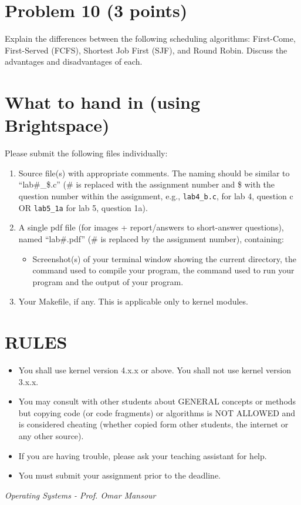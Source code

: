 \documentclass{article}
\begin{document}
\section*{Problem 10 (3 points)}

Explain the differences between the following scheduling algorithms: First-Come, First-Served (FCFS), Shortest Job First (SJF), and Round Robin.  Discuss the advantages and disadvantages of each.


\section*{What to hand in (using Brightspace)}

Please submit the following files individually:

\begin{enumerate}
    \item Source file(s) with appropriate comments. The naming should be similar to “lab\#\_\$.c” (\# is replaced with the assignment number and \$ with the question number within the assignment, e.g., \texttt{lab4\_b.c}, for lab 4, question c OR \texttt{lab5\_1a} for lab 5, question 1a).
    \item A single pdf file (for images + report/answers to short-answer questions), named “lab\#.pdf” (\# is replaced by the assignment number), containing:
    \begin{itemize}
        \item Screenshot(s) of your terminal window showing the current directory, the command used to compile your program, the command used to run your program and the output of your program.
    \end{itemize}
    \item Your Makefile, if any. This is applicable only to kernel modules.
\end{enumerate}


\section*{RULES}

\begin{itemize}
    \item You shall use kernel version 4.x.x or above. You shall not use kernel version 3.x.x.
    \item You may consult with other students about GENERAL concepts or methods but copying code (or code fragments) or algorithms is NOT ALLOWED and is considered cheating (whether copied form other students, the internet or any other source).
    \item If you are having trouble, please ask your teaching assistant for help.
    \item You must submit your assignment prior to the deadline.
\end{itemize}

\textit{Operating Systems - Prof. Omar Mansour}
\end{document}
